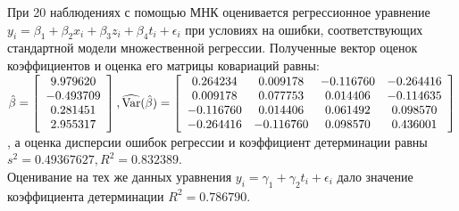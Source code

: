 \documentclass[addpoints, answers]{exam} %
\begin{document}
\begin{questions}
\begin{parts}
\end{parts}
\question При 20 наблюдениях с помощью МНК оценивается регрессионное уравнение $y_i=\beta_1+\beta_2 x_i+\beta_3 z_i+\beta_4 t_i+\epsilon_i$ при условиях на ошибки, соответствующих стандартной модели множественной регрессии. Полученные вектор оценок коэффициентов и оценка его матрицы ковариаций равны:\\
$\hat{\beta}=\left[ \begin{array}{c}
9.979620\\
-0.493709\\
0.281451\\
2.955317
\end{array}\right],
\widehat{\operatorname{Var}}(\hat{\beta})=\left[\begin{array}{cccc}
0.264234 & 0.009178 & -0.116760 & -0.264416\\
0.009178 & 0.077753 & 0.014406 & -0.114635\\
-0.116760 & 0.014406 & 0.061492 & 0.098570\\
-0.264416 & -0.116760 & 0.098570 & 0.436001
\end{array}\right]$\\, а оценка дисперсии ошибок регрессии и коэффициент детерминации равны $s^2=0.49367627, R^2=0.832389$.\\
Оценивание на тех же данных уравнения $y_i=\gamma_1+\gamma_2 t_i+\epsilon_i$ дало значение коэффициента детерминации $R^2=0.786790$.
\end{questions}
\end{document}
